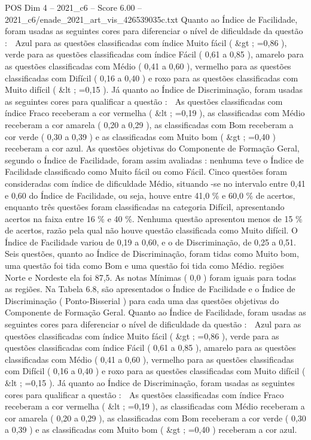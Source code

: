 \begin{textsample}{POS Dim 4 – 2021\_c6 – Score 6.00 – 2021\_c6/enade\_2021\_art\_vis\_426539035c.txt}
Quanto ao Índice de Facilidade, foram usadas as seguintes cores para diferenciar o nível de dificuldade da questão :  Azul para as questões classificadas com índice Muito fácil ( \&gt ; =0,86 ), verde para as questões classificadas com índice Fácil ( 0,61 a 0,85 ), amarelo para as questões classificadas com Médio ( 0,41 a 0,60 ), vermelho para as questões classificadas com Difícil ( 0,16 a 0,40 ) e roxo para as questões classificadas com Muito difícil ( \&lt ; =0,15 ).
Já quanto ao Índice de Discriminação, foram usadas as seguintes cores para qualificar a questão :  As questões classificadas com índice Fraco receberam a cor vermelha ( \&lt ; =0,19 ), as classificadas com Médio receberam a cor amarela ( 0,20 a 0,29 ), as classificadas com Bom receberam a cor verde ( 0,30 a 0,39 ) e as classificadas com Muito bom ( \&gt ; =0,40 ) receberam a cor azul.
As questões objetivas do Componente de Formação Geral, segundo o Índice de Facilidade, foram assim avaliadas : nenhuma teve o Índice de Facilidade classificado como Muito fácil ou como Fácil.
Cinco questões foram consideradas com índice de dificuldade Médio, situando -se no intervalo entre 0,41 e 0,60 do Índice de Facilidade, ou seja, houve entre 41,0 \% e 60,0 \% de acertos, enquanto três questões foram classificadas na categoria Difícil, apresentando acertos na faixa entre 16 \% e 40 \%.
Nenhuma questão apresentou menos de 15 \% de acertos, razão pela qual não houve questão classificada como Muito difícil.
O Índice de Facilidade variou de 0,19 a 0,60, e o de Discriminação, de 0,25 a 0,51.
Seis questões, quanto ao Índice de Discriminação, foram tidas como Muito bom, uma questão foi tida como Bom e uma questão foi tida como Médio. regiões Norte e Nordeste ela foi 87,5.
As notas Mínimas ( 0,0 ) foram iguais para todas as regiões.
Na Tabela 6.8, são apresentados o Índice de Facilidade e o Índice de Discriminação ( Ponto-Bisserial ) para cada uma das questões objetivas do Componente de Formação Geral.
Quanto ao Índice de Facilidade, foram usadas as seguintes cores para diferenciar o nível de dificuldade da questão :  Azul para as questões classificadas com índice Muito fácil ( \&gt ; =0,86 ), verde para as questões classificadas com índice Fácil ( 0,61 a 0,85 ), amarelo para as questões classificadas com Médio ( 0,41 a 0,60 ), vermelho para as questões classificadas com Difícil ( 0,16 a 0,40 ) e roxo para as questões classificadas com Muito difícil ( \&lt ; =0,15 ).
Já quanto ao Índice de Discriminação, foram usadas as seguintes cores para qualificar a questão :  As questões classificadas com índice Fraco receberam a cor vermelha ( \&lt ; =0,19 ), as classificadas com Médio receberam a cor amarela ( 0,20 a 0,29 ), as classificadas com Bom receberam a cor verde ( 0,30 a 0,39 ) e as classificadas com Muito bom ( \&gt ; =0,40 ) receberam a cor azul.

\end{textsample}
